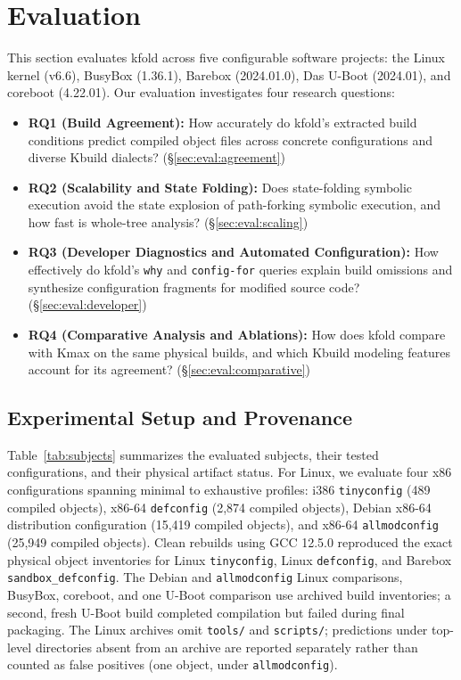 \documentclass[acmsmall]{acmart}
\newcommand{\tool}{\textsf{kfold}\xspace}
\newcommand{\kmax}{\textsf{Kmax}\xspace}
\providecommand{\tightlist}{\setlength{\itemsep}{0pt}\setlength{\parskip}{0pt}}
\begin{document}
\section{Evaluation}\label{sec:evaluation}

This section evaluates \tool across five configurable software projects: the Linux kernel (v6.6), BusyBox (1.36.1), Barebox (2024.01.0), Das U-Boot (2024.01), and coreboot (4.22.01).
Our evaluation investigates four research questions:
\begin{itemize}
\tightlist
\item \textbf{RQ1 (Build Agreement):} How accurately do \tool's extracted build conditions predict compiled object files across concrete configurations and diverse Kbuild dialects? (\S\ref{sec:eval:agreement})
\item \textbf{RQ2 (Scalability and State Folding):} Does state-folding symbolic execution avoid the state explosion of path-forking symbolic execution, and how fast is whole-tree analysis? (\S\ref{sec:eval:scaling})
\item \textbf{RQ3 (Developer Diagnostics and Automated Configuration):} How effectively do \tool's \texttt{why} and \texttt{config-for} queries explain build omissions and synthesize configuration fragments for modified source code? (\S\ref{sec:eval:developer})
\item \textbf{RQ4 (Comparative Analysis and Ablations):} How does \tool compare with \kmax on the same physical builds, and which Kbuild modeling features account for its agreement? (\S\ref{sec:eval:comparative})
\end{itemize}

\subsection{Experimental Setup and Provenance}\label{sec:eval:setup}

Table~\ref{tab:subjects} summarizes the evaluated subjects, their tested configurations, and their physical artifact status.
For Linux, we evaluate four x86 configurations spanning minimal to exhaustive profiles: i386 \texttt{tinyconfig} (489 compiled objects), x86-64 \texttt{defconfig} (2,874 compiled objects), Debian x86-64 distribution configuration (15,419 compiled objects), and x86-64 \texttt{allmodconfig} (25,949 compiled objects).
Clean rebuilds using GCC 12.5.0 reproduced the exact physical object inventories for Linux \texttt{tinyconfig}, Linux \texttt{defconfig}, and Barebox \texttt{sandbox\_defconfig}.
The Debian and \texttt{allmodconfig} Linux comparisons, BusyBox, coreboot, and one U-Boot comparison use archived build inventories; a second, fresh U-Boot build completed compilation but failed during final packaging.
The Linux archives omit \texttt{tools/} and \texttt{scripts/}; predictions under top-level directories absent from an archive are reported separately rather than counted as false positives (one object, under \texttt{allmodconfig}).
\end{document}
